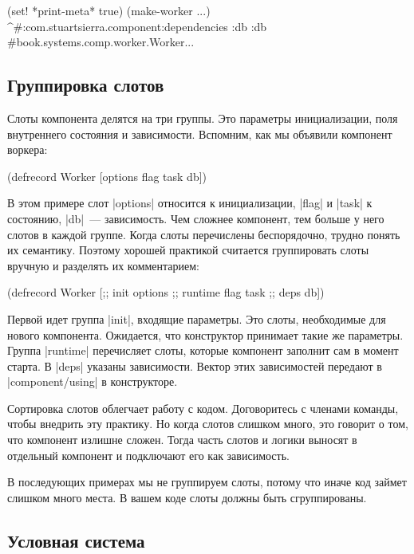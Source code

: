 \begin{code}
(set! *print-meta* true)
(make-worker {...})
^#:com.stuartsierra.component{:dependencies {:db :db}}
#book.systems.comp.worker.Worker{...}
\end{code}

\subsection{Группировка слотов}

Слоты компонента делятся на три группы. Это параметры инициализации, поля
внутреннего состояния и зависимости. Вспомним, как мы объявили компонент
воркера:

\begin{code}
(defrecord Worker
    [options flag task db])
\end{code}

В этом примере слот \spverb|options| относится к инициализации, \spverb|flag| и \spverb|task| к
состоянию, \spverb|db|~--- зависимость. Чем сложнее компонент, тем больше у него слотов в
каждой группе. Когда слоты перечислены беспорядочно, трудно понять их
семантику. Поэтому хорошей практикой считается группировать слоты вручную и
разделять их комментарием:

\begin{code}
(defrecord Worker
    [;; init
     options
     ;; runtime
     flag task
     ;; deps
     db])
\end{code}

Первой идет группа \spverb|init|, входящие параметры. Это слоты, необходимые для нового
компонента. Ожидается, что конструктор принимает такие же параметры. Группа
\spverb|runtime| перечисляет слоты, которые компонент заполнит сам в момент старта. В
\spverb|deps| указаны зависимости. Вектор этих зависимостей передают в
\spverb|component/using| в конструкторе.

Сортировка слотов облегчает работу с кодом. Договоритесь с членами команды,
чтобы внедрить эту практику. Но когда слотов слишком много, это говорит о том,
что компонент излишне сложен. Тогда часть слотов и логики выносят в отдельный
компонент и подключают его как зависимость.

В последующих примерах мы не группируем слоты, потому что иначе код займет
слишком много места. В вашем коде слоты должны быть сгруппированы.

\subsection{Условная система}

